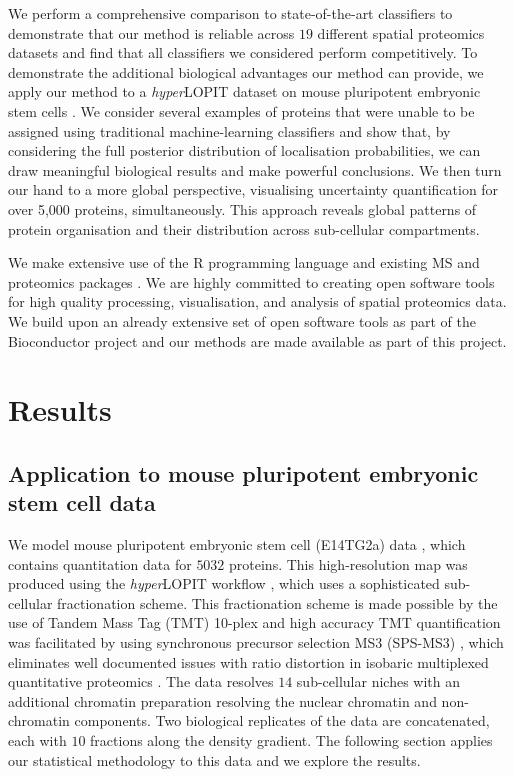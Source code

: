 \documentclass[12pt,english]{article}\usepackage[]{graphicx}\usepackage[]{color}
\begin{document}
We perform a comprehensive comparison to state-of-the-art classifiers
to demonstrate that our method is reliable across $19$ different
spatial proteomics datasets and find that all classifiers we
considered perform competitively. To demonstrate the additional
biological advantages our method can provide, we apply our method to a
\textit{hyper}LOPIT dataset on mouse pluripotent embryonic stem cells
\citep{hyper}. We consider several examples of proteins that were
unable to be assigned using traditional machine-learning classifiers
and show that, by considering the full posterior distribution of
localisation probabilities, we can draw meaningful biological results
and make powerful conclusions. We then turn our hand to a more global
perspective, visualising uncertainty quantification for over 5,000
proteins, simultaneously. This approach reveals global patterns of
protein organisation and their distribution across sub-cellular
compartments.

We make extensive use of the R programming language \citep{R} and
existing MS and proteomics packages \citep{MSnbase:2012,
  pRoloc:2014}. We are highly committed to creating open software
tools for high quality processing, visualisation, and analysis of
spatial proteomics data.  We build upon an already extensive set of
open software tools \citep{pRoloc:2014} as part of the Bioconductor
project \citep{Bioconductor::2004, Huber::2015} and our methods are
made available as part of this project.

\section{Results}

\subsection{Application to mouse pluripotent embryonic stem cell data}

We model mouse pluripotent embryonic stem cell (E14TG2a) data
\citep{hyper}, which contains quantitation data for $5032$
proteins. This high-resolution map was produced using the
\textit{hyper}LOPIT workflow \citep{Mulvey:2017}, which uses a
sophisticated sub-cellular fractionation scheme. This fractionation
scheme is made possible by the use of Tandem Mass Tag (TMT) 10-plex
and high accuracy TMT quantification was facilitated by using
synchronous precursor selection MS3 (SPS-MS3) \citep{Mcalister::2014},
which eliminates well documented issues with ratio distortion in
isobaric multiplexed quantitative proteomics \citep{Ting:2011}. The
data resolves $14$ sub-cellular niches with an additional chromatin
preparation resolving the nuclear chromatin and non-chromatin
components. Two biological replicates of the data are concatenated,
each with $10$ fractions along the density gradient. The following
section applies our statistical methodology to this data and we
explore the results.
\end{document}
